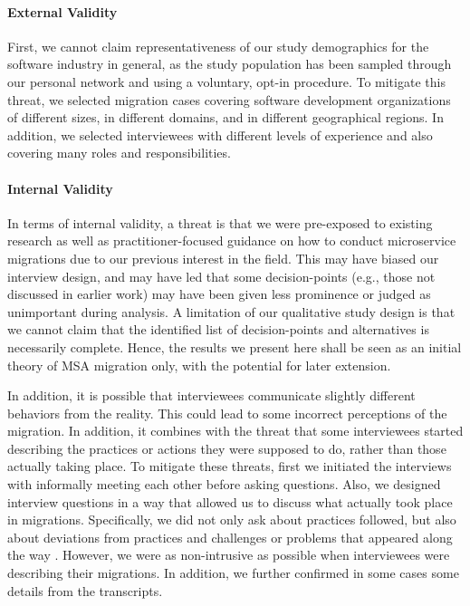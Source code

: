\documentclass[sigconf,dvipsnames]{acmart}
\begin{document}
\vspace{-0.1em}
\paragraph*{External Validity}
First, we cannot claim representativeness of our study demographics for the software industry in general, as the study population has been sampled through our personal network and using a voluntary, opt-in procedure. To mitigate this threat, we selected migration cases covering software development organizations of different sizes, in different domains, and in different geographical regions. In addition, we selected interviewees with different levels of experience and also covering many roles and responsibilities. 

\vspace{-0.5em}
\paragraph*{Internal Validity}
In terms of internal validity, a threat is that we were pre-exposed to existing research as well as practitioner-focused guidance on how to conduct microservice migrations due to our previous interest in the field. This may have biased our interview design, and may have led that some decision-points (e.g., those not discussed in earlier work) may have been given less prominence or judged as unimportant during analysis. A limitation of our qualitative study design is that we cannot claim that the identified list of decision-points and alternatives is necessarily complete. Hence, the results we present here shall be seen as an initial theory of MSA migration only, with the potential for later extension.

In addition, it is possible that interviewees communicate slightly different behaviors from the reality. This could lead to some incorrect perceptions of the migration. In addition, it combines with the threat that some interviewees started describing the practices or actions they were supposed to do, rather than those actually taking place. To mitigate these threats, first we initiated the interviews with informally meeting each other before asking questions. Also, we designed interview questions in a way that allowed us to discuss what actually took place in migrations. Specifically, we did not only ask about practices followed, but also about deviations from practices and challenges or problems that appeared along the way \cite{michael_ayas_hamdy_2021_5060129}.
However, we were as non-intrusive as possible when interviewees were describing their migrations. 
In addition, we further confirmed in some cases some details from the transcripts. 
\end{document}
